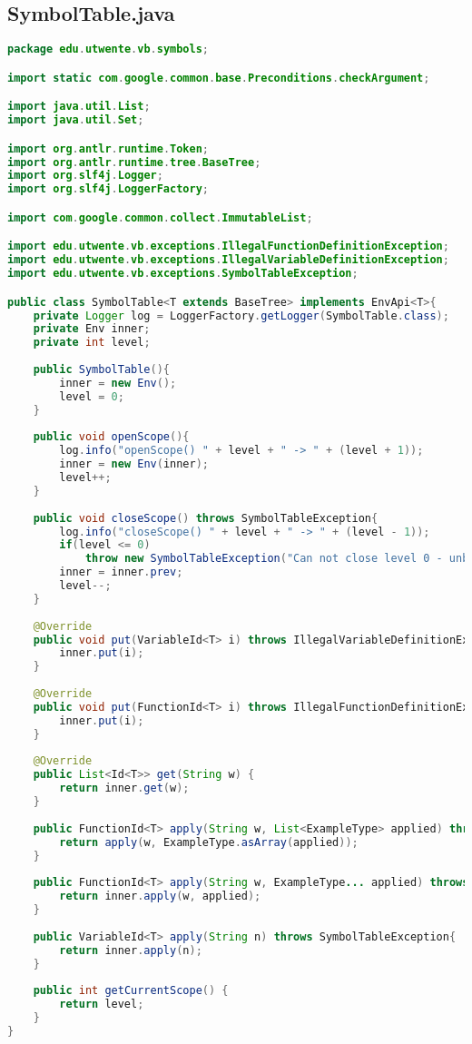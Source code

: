 \subsection{SymbolTable.java}
\begin{lstlisting}[language=Java]
package edu.utwente.vb.symbols;

import static com.google.common.base.Preconditions.checkArgument;

import java.util.List;
import java.util.Set;

import org.antlr.runtime.Token;
import org.antlr.runtime.tree.BaseTree;
import org.slf4j.Logger;
import org.slf4j.LoggerFactory;

import com.google.common.collect.ImmutableList;

import edu.utwente.vb.exceptions.IllegalFunctionDefinitionException;
import edu.utwente.vb.exceptions.IllegalVariableDefinitionException;
import edu.utwente.vb.exceptions.SymbolTableException;

public class SymbolTable<T extends BaseTree> implements EnvApi<T>{
	private Logger log = LoggerFactory.getLogger(SymbolTable.class);
	private Env inner;
	private int level;
	
	public SymbolTable(){
		inner = new Env();
		level = 0;
	}
	
	public void openScope(){
		log.info("openScope() " + level + " -> " + (level + 1));
		inner = new Env(inner);		
		level++;
	}
	
	public void closeScope() throws SymbolTableException{
		log.info("closeScope() " + level + " -> " + (level - 1));
		if(level <= 0)
			throw new SymbolTableException("Can not close level 0 - unbalanced indents");
		inner = inner.prev;
		level--;
	}
	
	@Override
	public void put(VariableId<T> i) throws IllegalVariableDefinitionException {
		inner.put(i);
	}
	
	@Override
	public void put(FunctionId<T> i) throws IllegalFunctionDefinitionException {
		inner.put(i);
	}
	
	@Override
	public List<Id<T>> get(String w) {
		return inner.get(w);
	}
	
	public FunctionId<T> apply(String w, List<ExampleType> applied) throws SymbolTableException{
		return apply(w, ExampleType.asArray(applied));
	}
	
	public FunctionId<T> apply(String w, ExampleType... applied) throws SymbolTableException{
		return inner.apply(w, applied);
	}
	
	public VariableId<T> apply(String n) throws SymbolTableException{
		return inner.apply(n);
	}
	
	public int getCurrentScope() {
		return level;
	}
}
\end{lstlisting}
